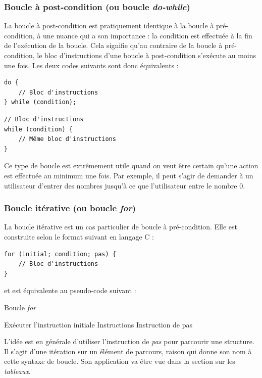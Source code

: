 \documentclass[../../../main.tex]{subfiles}
\begin{document}
\subsubsection{Boucle à post-condition (ou boucle \textit{do-while})}
 
La boucle à post-condition est pratiquement identique à la boucle à pré-condition, à une nuance qui a son importance : la condition est effectuée à la fin de l'exécution de la boucle. Cela signifie qu'au contraire de la boucle à pré-condition, le bloc d'instructions d'une boucle à post-condition s'exécute au moins une fois. Les deux codes suivants sont donc équivalents :
 
\begin{minipage}{0.5\textwidth}
\begin{verbatim}
do {
	// Bloc d'instructions
} while (condition);

\end{verbatim}
\end{minipage}
\begin{minipage}{0.5\textwidth}
\begin{verbatim}
// Bloc d'instructions
while (condition) {
	// Même bloc d'instructions
}
\end{verbatim}
\end{minipage}
 
Ce type de boucle est extrêmement utile quand on veut être certain qu'une action est effectuée au minimum une fois. Par exemple, il peut s'agir de demander à un utilisateur d'entrer des nombres jusqu'à ce que l'utilisateur entre le nombre $0$.
 
\subsubsection{Boucle itérative (ou boucle \textit{for})}
 
La boucle itérative est un cas particulier de boucle à pré-condition. Elle est construite selon le format suivant en langage C :
\begin{verbatim}
for (initial; condition; pas) {
	// Bloc d'instructions
}
\end{verbatim}
et est équivalente au pseudo-code suivant :
\begin{algorithm}
\caption{Boucle \textit{for}}
Exécuter l'instruction initiale\;
 {
	Instructions 
	Instruction de pas 
}
\end{algorithm} \newline
L'idée est en générale d'utiliser l'instruction de \textit{pas} pour parcourir une structure. Il s'agit d'une itération sur un élément de parcours, raison qui donne son nom à cette syntaxe de boucle. Son application va être vue dans la section sur les \textit{tableaux}.
 
\end{document}
